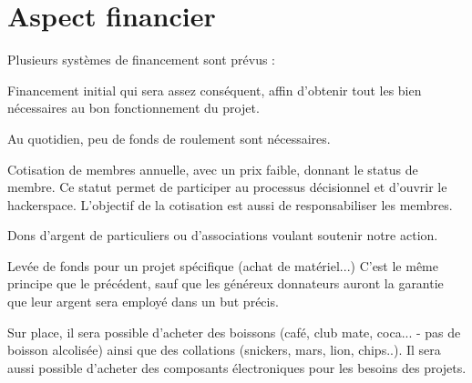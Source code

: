 \documentclass[a4paper]{article}
\begin{document}
\section{Aspect financier} %
Plusieurs systèmes de financement sont prévus :
\begin{list}{o}{}
\item Financement initial qui sera assez conséquent, affin d'obtenir tout les bien nécessaires au bon fonctionnement du projet.
\item Au quotidien, peu de fonds de roulement sont nécessaires.
\item Cotisation  de membres annuelle, avec un prix faible, donnant le status de membre.  Ce statut permet de participer au processus décisionnel et d’ouvrir le  hackerspace. L’objectif de la cotisation est aussi de responsabiliser  les membres.
\item Dons d’argent de particuliers ou d’associations voulant soutenir notre action.
\item Levée de fonds pour un projet spécifique (achat de matériel...) C’est le même principe que le précédent,
sauf que les généreux donnateurs auront la garantie que leur argent sera employé dans un but précis.
\item Sur  place, il sera possible d’acheter des boissons (café, club mate,  coca... - pas de boisson alcolisée) ainsi que des collations (snickers,  mars, lion, chips..). Il sera aussi possible d’acheter des composants  électroniques pour les besoins des projets.
\end{list} 
\end{document}
